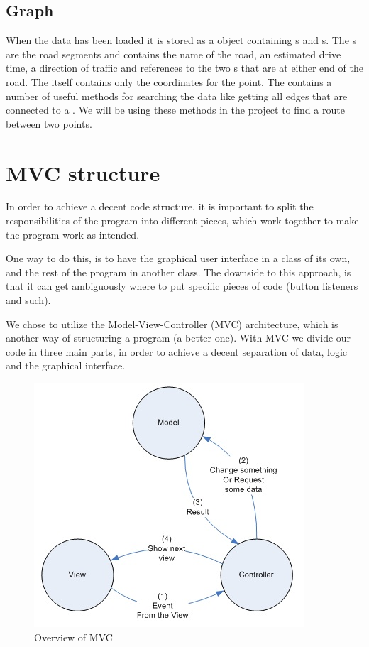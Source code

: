 \subsection{Graph}
\label{BG-DS-G}
When the data has been loaded it is stored as a  object containing 
s and s. The s are the 
road segments and contains the name of the road, an estimated drive time, 
a direction of traffic and references to the two s that are at 
either end of the road.  The  itself contains only the coordinates 
for the point. The  contains a number of useful methods for 
searching the data like getting all edges that are connected to a
. We will be using these methods in the project to find a
route between two points.
\section{MVC structure}
\label{BG-MVC}
In order to achieve a decent code structure, it is important to split the 
responsibilities of the program into different pieces, which work together 
to make the program work as intended.

One way to do this, is to have the graphical user interface in a class of its
own, and the rest of the program in another class. The downside to this
approach, is that it can get ambiguously where to put specific pieces of code
(button listeners and such).

We chose to utilize the Model-View-Controller (MVC) architecture, which is
another way of structuring a program (a better one). With MVC we divide our code
in three main parts, in order to achieve a decent separation of data, logic and
the graphical interface.

\begin{figure}[h!]
\centering
\includegraphics[width=0.5\linewidth]{images/mvc}
\caption{Overview of MVC}
\label{mvc-overview}
\end{figure}

